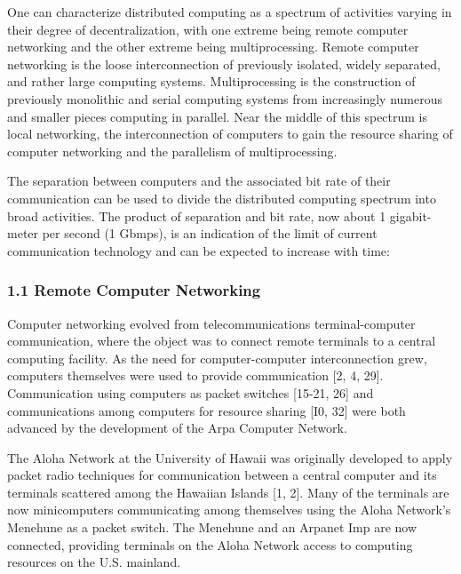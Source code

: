One can characterize distributed computing as a spectrum of activities varying in their degree of decentralization, with one extreme being remote computer networking and the other extreme being multiprocessing. Remote computer networking is the loose interconnection of previously isolated, widely separated, and rather large computing systems.  Multiprocessing is the construction of previously monolithic and serial computing systems from increasingly numerous and smaller pieces computing in parallel. Near the middle of this spectrum is local networking, the interconnection of computers to gain the resource sharing of computer networking and the parallelism of multiprocessing.

The separation between computers and the associated bit rate of their communication can be used to divide the distributed computing spectrum into broad activities. The product of separation and bit rate, now about 1 gigabit-meter per second (1 Gbmps), is an indication of the limit of current communication technology and can be expected to increase with time:



\vspace{-15pt}
\subsubsection{1.1 Remote Computer Networking}
\vspace{-6pt}

Computer networking evolved from telecommunications terminal-computer communication, where the object was to connect remote terminals to a central computing facility. As the need for computer-computer interconnection grew, computers themselves were used to provide communication [2, 4, 29]. Communication using computers as packet switches [15-21, 26] and communications among computers for resource sharing [I0, 32] were both advanced by the development of the Arpa Computer Network.

The Aloha Network at the University of Hawaii was originally developed to apply packet radio techniques for communication between a central computer and its terminals scattered among the Hawaiian Islands [1, 2]. Many of the terminals are now minicomputers communicating among themselves using the Aloha Network's Menehune as a packet switch. The Menehune and an Arpanet Imp are now connected, providing terminals on the Aloha Network access to computing resources on the U.S. mainland.

